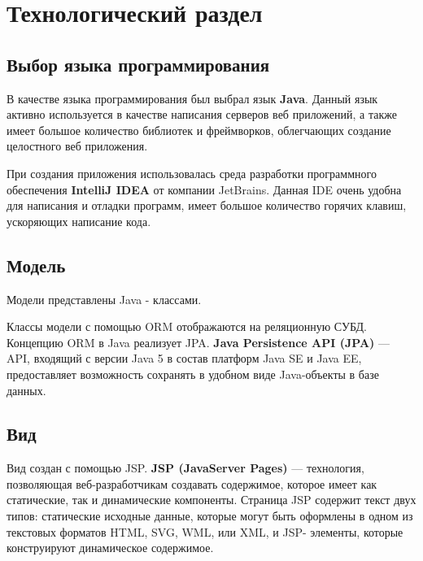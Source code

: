 \chapter{Технологический раздел}

\section{Выбор языка программирования}
В качестве языка программирования был выбрал язык \textbf{Java}. Данный язык активно используется в качестве написания серверов веб приложений, а также имеет большое количество библиотек и фреймворков, облегчающих создание целостного веб приложения.

При создания приложения использовалась среда разработки программного обеспечения \textbf{IntelliJ IDEA} от компании JetBrains. Данная IDE очень удобна для написания и отладки программ, имеет большое количество горячих клавиш, ускоряющих написание кода.  

\section{Модель}

Модели представлены Java - классами.

 

Классы модели с помощью ORM отображаются на реляционную СУБД. Концепцию ORM в Java реализует JPA. \textbf{Java Persistence API (JPA)} — API, входящий с версии Java 5 в состав платформ Java SE и Java EE, предоставляет возможность сохранять в удобном виде Java-объекты в базе данных.

 

\section{Вид}

Вид создан с помощью JSP. \textbf{JSP (JavaServer Pages)} — технология, позволяющая веб-разработчикам создавать содержимое, которое имеет как статические, так и динамические компоненты. Страница JSP содержит текст двух типов: статические исходные данные, которые могут быть оформлены в одном из текстовых форматов HTML, SVG, WML, или XML, и JSP- элементы, которые конструируют динамическое содержимое.

 


